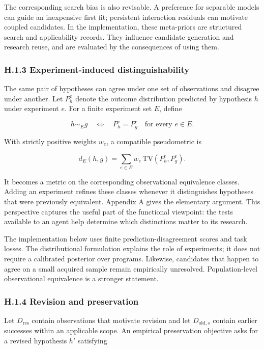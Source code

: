 \documentclass[11pt,a4paper]{article}
\begin{document}
The corresponding search bias is also revisable. A preference for separable models can guide an inexpensive first fit; persistent interaction residuals can motivate coupled candidates. In the implementation, these meta-priors are structured search and applicability records. They influence candidate generation and research reuse, and are evaluated by the consequences of using them.


\subsubsection*{H.1.3 Experiment-induced distinguishability}

The same pair of hypotheses can agree under one set of observations and disagree under another. Let \(P_h^e\) denote the outcome distribution predicted by hypothesis \(h\) under experiment \(e\). For a finite experiment set \(E\), define


\[
h\sim_E g
\quad\Longleftrightarrow\quad
P_h^e=P_g^e\quad\text{for every }e\in E.
\]


With strictly positive weights \(w_e\), a compatible pseudometric is


\[
d_E(h,g)=\sum_{e\in E}w_e\,\mathrm{TV}(P_h^e,P_g^e).
\]


It becomes a metric on the corresponding observational equivalence classes. Adding an experiment refines these classes whenever it distinguishes hypotheses that were previously equivalent. Appendix A gives the elementary argument. This perspective captures the useful part of the functional viewpoint: the tests available to an agent help determine which distinctions matter to its research.


The implementation below uses finite prediction-disagreement scores and task losses. The distributional formulation explains the role of experiments; it does not require a calibrated posterior over programs. Likewise, candidates that happen to agree on a small acquired sample remain empirically unresolved. Population-level observational equivalence is a stronger statement.


\subsubsection*{H.1.4 Revision and preservation}

Let \(D_{\mathrm{res}}\) contain observations that motivate revision and let \(D_{\mathrm{old},s}\) contain earlier successes within an applicable scope. An empirical preservation objective asks for a revised hypothesis \(h'\) satisfying
\end{document}
